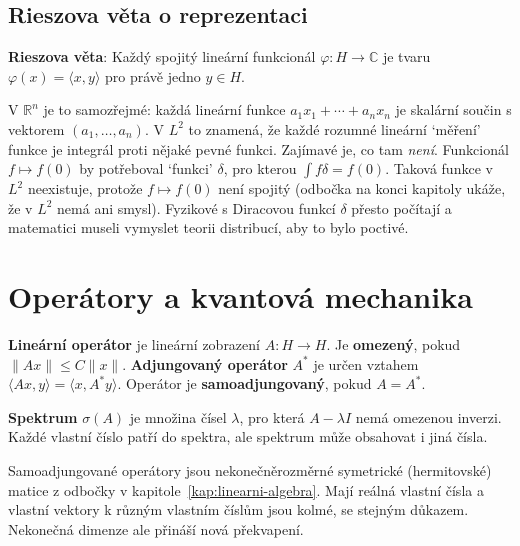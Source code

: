 \subsection{Rieszova věta o reprezentaci}

\begin{definitionbox}
  \textbf{Rieszova věta}: Každý spojitý lineární funkcionál $\varphi\colon H\to\mathbb{C}$ je tvaru $\varphi(x) = \langle x, y\rangle$ pro právě jedno $y\in H$.
\end{definitionbox}

V $\mathbb{R}^n$ je to samozřejmé: každá lineární funkce $a_1x_1 + \cdots + a_nx_n$ je skalární součin s vektorem $(a_1, \dots, a_n)$. V $L^2$ to znamená, že každé rozumné lineární `měření' funkce je integrál proti nějaké pevné funkci. Zajímavé je, co tam \textit{není}. Funkcionál $f\mapsto f(0)$ by potřeboval `funkci' $\delta$, pro kterou $\int f\delta = f(0)$. Taková funkce v $L^2$ neexistuje, protože $f\mapsto f(0)$ není spojitý (odbočka na konci kapitoly ukáže, že v $L^2$ nemá ani smysl). Fyzikové s Diracovou funkcí $\delta$ přesto počítají a matematici museli vymyslet teorii distribucí, aby to bylo poctivé.

\section{Operátory a kvantová mechanika}

\begin{definitionbox}
  \textbf{Lineární operátor} je lineární zobrazení $A\colon H\to H$. Je \textbf{omezený}, pokud $\|Ax\|\leq C\|x\|$. \textbf{Adjungovaný operátor} $A^\ast$ je určen vztahem $\langle Ax, y\rangle = \langle x, A^\ast y\rangle$. Operátor je \textbf{samoadjungovaný}, pokud $A = A^\ast$.

  \vspace{0.2cm}

  \textbf{Spektrum} $\sigma(A)$ je množina čísel $\lambda$, pro která $A - \lambda I$ nemá omezenou inverzi. Každé vlastní číslo patří do spektra, ale spektrum může obsahovat i jiná čísla.
\end{definitionbox}

Samoadjungované operátory jsou nekonečněrozměrné symetrické (hermitovské) matice z odbočky v kapitole~\ref{kap:linearni-algebra}. Mají reálná vlastní čísla a vlastní vektory k různým vlastním číslům jsou kolmé, se stejným důkazem. Nekonečná dimenze ale přináší nová překvapení.

